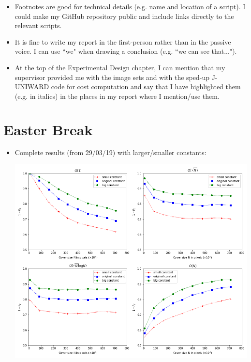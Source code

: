 \documentclass[11pt,a4paper]{report}
\begin{document}
\begin{itemize}
  \item Footnotes are good for technical details (e.g. name and location of a script). I could make my GitHub repository public and include links directly to the relevant scripts.
  
  \item It is fine to write my report in the first-person rather than in the passive voice. I can use ``we" when drawing a conclusion (e.g. ``we can see that...").
  
  \item At the top of the Experimental Design chapter, I can mention that my supervisor provided me with the image sets and with the sped-up J-UNIWARD code for cost computation and say that I have highlighted them (e.g. in italics) in the places in my report where I mention/use them.

\end{itemize}

\section{Easter Break}

\begin{itemize}

  \item Complete results (from 29/03/19) with larger/smaller constants:
    \begin{center}
      \includegraphics[width=\linewidth]{graph_29_03_2019.png}
    \end{center}

\end{itemize}
\end{document}

